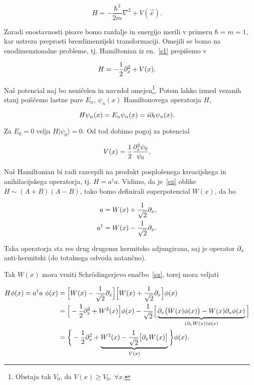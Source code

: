 \begin{equation}
	H = -\frac{\hbar^2}{2m}\nabla^2 + V(\vec{x}).
	\label{s1}
\end{equation}

\ni Zaradi enostavnosti pisave bomo razdalje in energijo merili v primeru $\hbar = m = 1$, kar ustreza preprosti
brezdimenzijski transformaciji. Omejili se bomo na enodimenzionalne probleme, tj. Hamiltonian iz en.~\eqref{s1}
prepi\v semo v

\begin{equation}
	H = -\frac{1}{2}\partial_x^2 + V(x).
	\label{sx}
\end{equation}

\ni Na\v s potencial naj bo neni\v celen in navzdol omejen\footnote{Obstaja tak $V_0$, da $V(x) \geq V_0,\ \forall x$.}. Potem
lahko izmed vezanih stanj poi\v s\v cemo lastne pare $E_n$, $\psi_n (x)$ Hamiltonovega operatorja $H$,

\begin{equation}
	H\psi_n(x) = E_n\psi_n(x) = i\partial_t\psi_n(x).
\end{equation}

\ni Za $E_0 = 0$ velja $H|\psi_0\rangle = 0$. Od tod dobimo pogoj za potencial

\begin{equation}
	V(x) = \frac{1}{2}\frac{\partial_x^2\psi_0}{\psi_0},
	\label{vpogoj}
\end{equation}

Na\v s Hamiltonian bi radi razcepili na produkt posplo\v senega kreacijskega in anihilacijskega operatorja, tj.
$H = a^\dagger a$. Vidimo, da je~\eqref{sx} oblike
$H \sim (A + B)(A - B)$, tako bomo definirali superpotencial $W(x)$, da bo

\begin{align}
	a &= W(x) + \frac{1}{\sqrt{2}}\partial_x,          \label{anihilator} \\
	a^\dagger &= W(x) - \frac{1}{\sqrt{2}}\partial_x.  \label{kreator}
\end{align}

\ni Taka operatorja sta res drug drugemu hermitsko adjungirana, saj je operator $\partial_x$ anti-hermitski (do totalnega
odvoda natan\v cno).

Tak $W(x)$ mora vrniti Schr\" odingerjevo ena\v cbo~\eqref{sx}, torej mora veljati

\begin{align}
	H\phi(x) = a^\dagger a\ \phi(x)&= \Big[W(x) - \frac{1}{\sqrt{2}}\partial_x\Big]\Big[W(x) +
		\frac{1}{\sqrt{2}}\partial_x\Big]\phi(x) \notag \\
	&= \Big[-\frac{1}{2}\partial_x^2 + W^2(x)\Big]\phi(x) - \frac{1}{\sqrt{2}}\Big[
		\underbrace{\partial_x \big(W(x)\phi(x)\big) - W(x)\partial_x\phi(x)}_{(\partial_x W(x))\phi(x)} \Big] \notag \\
	&= \bigg\{-\frac{1}{2}\partial_x^2 +
		\underbrace{W^2(x) - \frac{1}{\sqrt{2}}\big[\partial_x W(x)\big]}_{V(x)}\bigg\}\phi(x).
	\label{dokaz.aad}
\end{align}

